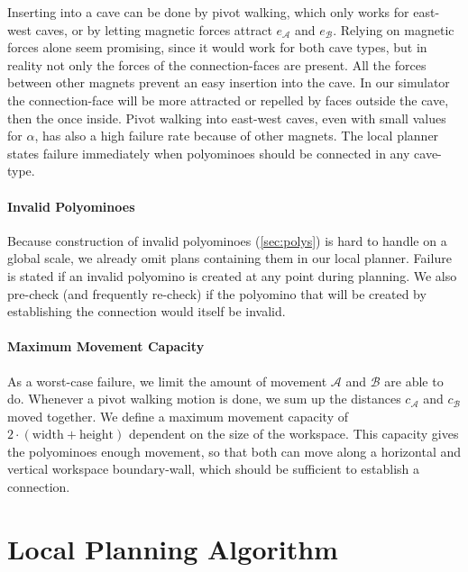 Inserting into a cave can be done by pivot walking, which only works for east-west caves, or by letting magnetic forces attract $e_\mathcal{A}$ and $e_\mathcal{B}$.
Relying on magnetic forces alone seem promising, since it would work for both cave types, but in reality not only the forces of the connection-faces are present.
All the forces between other magnets prevent an easy insertion into the cave.
In our simulator the connection-face will be more attracted or repelled by faces outside the cave, then the once inside.
Pivot walking into east-west caves, even with small values for $\alpha$, has also a high failure rate because of other magnets.
The local planner states failure immediately when polyominoes should be connected in any cave-type.

\paragraph{Invalid Polyominoes}

Because construction of invalid polyominoes (\autoref{sec:polys}) is hard to handle on a global scale, we already omit plans containing them in our local planner.
Failure is stated if an invalid polyomino is created at any point during planning.
We also pre-check (and frequently re-check) if the polyomino that will be created by establishing the connection would itself be invalid. 

\paragraph{Maximum Movement Capacity}

As a worst-case failure, we limit the amount of movement $\mathcal{A}$ and $\mathcal{B}$ are able to do.
Whenever a pivot walking motion is done, we sum up the distances $c_\mathcal{A}$ and $c_\mathcal{B}$ moved together.
We define a maximum movement capacity of $2\cdot(\text{width} + \text{height})$ dependent on the size of the workspace.
This capacity gives the polyominoes enough movement, so that both can move along a horizontal and vertical workspace boundary-wall, which should be sufficient to establish a connection.

\section{Local Planning Algorithm}
\label{sec:local_algo}

